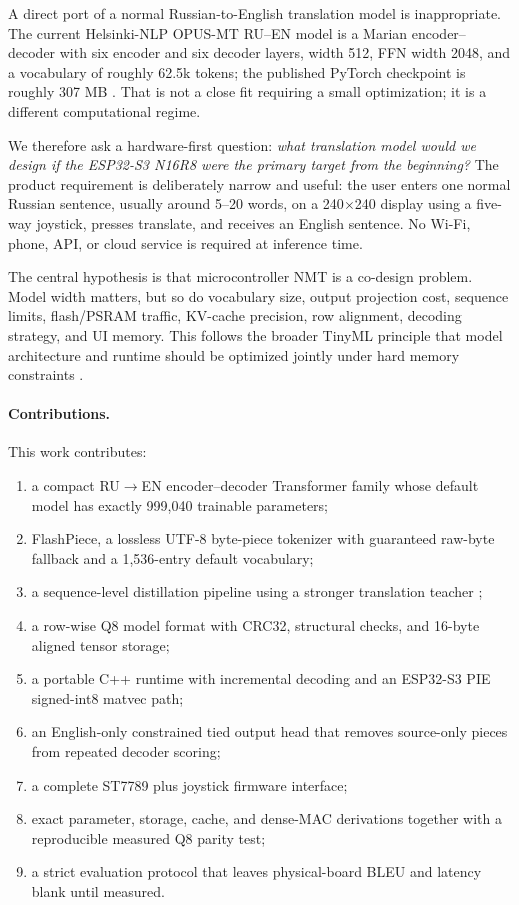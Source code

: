 \documentclass{article}
\begin{document}
A direct port of a normal Russian-to-English translation model is inappropriate. The current Helsinki-NLP OPUS-MT RU--EN model is a Marian encoder--decoder with six encoder and six decoder layers, width 512, FFN width 2048, and a vocabulary of roughly 62.5k tokens; the published PyTorch checkpoint is roughly 307 MB \citep{hf_opusmt_ruen,tiedemann2020opusmt}. That is not a close fit requiring a small optimization; it is a different computational regime.

We therefore ask a hardware-first question: \emph{what translation model would we design if the ESP32-S3 N16R8 were the primary target from the beginning?} The product requirement is deliberately narrow and useful: the user enters one normal Russian sentence, usually around 5--20 words, on a 240$\times$240 display using a five-way joystick, presses translate, and receives an English sentence. No Wi-Fi, phone, API, or cloud service is required at inference time.

The central hypothesis is that microcontroller NMT is a co-design problem. Model width matters, but so do vocabulary size, output projection cost, sequence limits, flash/PSRAM traffic, KV-cache precision, row alignment, decoding strategy, and UI memory. This follows the broader TinyML principle that model architecture and runtime should be optimized jointly under hard memory constraints \citep{lin2020mcunet}.

\paragraph{Contributions.}
This work contributes:
\begin{enumerate}[leftmargin=*,itemsep=2pt]
\item a compact RU$\rightarrow$EN encoder--decoder Transformer family whose default model has exactly 999,040 trainable parameters;
\item FlashPiece, a lossless UTF-8 byte-piece tokenizer with guaranteed raw-byte fallback and a 1,536-entry default vocabulary;
\item a sequence-level distillation pipeline using a stronger translation teacher \citep{kim2016sequence};
\item a row-wise Q8 model format with CRC32, structural checks, and 16-byte aligned tensor storage;
\item a portable C++ runtime with incremental decoding and an ESP32-S3 PIE signed-int8 matvec path;
\item an English-only constrained tied output head that removes source-only pieces from repeated decoder scoring;
\item a complete ST7789 plus joystick firmware interface;
\item exact parameter, storage, cache, and dense-MAC derivations together with a reproducible measured Q8 parity test;
\item a strict evaluation protocol that leaves physical-board BLEU and latency blank until measured.
\end{enumerate}
\end{document}
